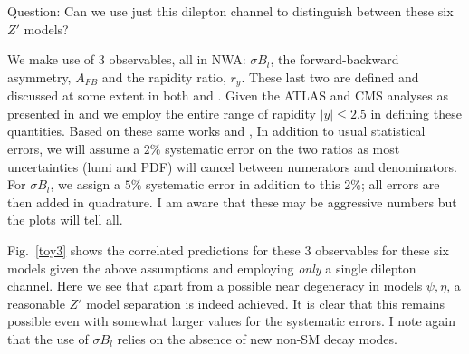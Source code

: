 \documentclass[14pt]{article}
\begin{document}
Question: Can we use just this dilepton channel to distinguish between these six $Z'$ models?  

We make use of 3 observables, all in NWA: $\sigma B_l$, the forward-backward asymmetry, $A_{FB}$ and the rapidity ratio, $r_y$. These last two are defined 
and discussed at some extent in both \cite{Rizzo:2014xma} and \cite{Han:2013mra}.  Given the ATLAS and CMS analyses as presented in \cite{Han:2016qpd} 
and \cite{CMS:2017zzj} we employ the entire range of rapidity $|y|\leq 2.5$ in defining these quantities. Based on these same works and \cite{Han:2013mra}, 
In addition to usual statistical errors, we will assume a $2\%$ systematic error on the two ratios as most uncertainties (lumi and PDF) will cancel between numerators 
and denominators. For $\sigma B_l$, we assign a $5\%$ systematic error in addition to this $2\%$; all errors are then added in quadrature. I am aware that these may 
be aggressive numbers but the plots will tell all. 

%
%


Fig.~\ref{toy3} shows the correlated predictions for these 3 observables for these six models given the above assumptions and employing {\it only} a single dilepton 
channel. Here we see that apart from a possible near degeneracy in models $\psi,\eta$, a reasonable $Z'$ model separation is indeed achieved. It is clear that this 
remains possible even with somewhat larger values for the systematic errors. I note again that the use of $\sigma B_l$ relies on the absence of new non-SM decay 
modes.


%
%
\end{document}
